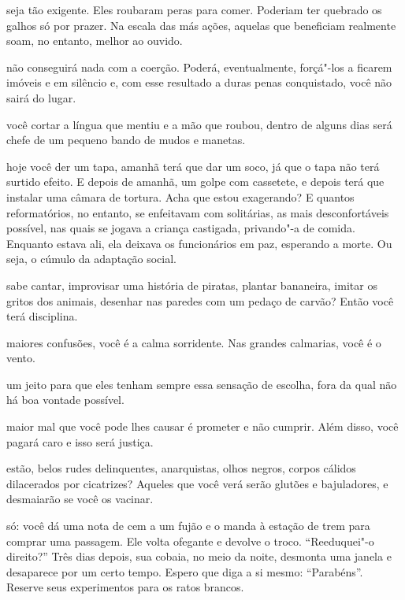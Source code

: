 \bigskip
\bigskip

 seja tão exigente. Eles roubaram peras para comer. Poderiam ter
quebrado os galhos só por prazer. Na escala das más ações, aquelas que
beneficiam realmente soam, no entanto, melhor ao ouvido.

\bigskip
\bigskip

 não conseguirá nada com a coerção. Poderá, eventualmente, forçá"-los
a ficarem imóveis e em silêncio e, com esse resultado a duras penas
conquistado, você não sairá do lugar.



 você cortar a língua que mentiu e a mão que roubou, dentro de alguns
dias será chefe de um pequeno bando de mudos e manetas.



 hoje você der um tapa, amanhã terá que dar um soco, já que o tapa não
terá surtido efeito. E depois de amanhã, um golpe com cassetete, e
depois terá que instalar uma câmara de tortura. Acha que estou
exagerando? E quantos reformatórios, no entanto, se enfeitavam com
solitárias, as mais desconfortáveis possível, nas quais se jogava a
criança castigada, privando"-a de comida. Enquanto estava ali, ela
deixava os funcionários em paz, esperando a morte. Ou seja, o cúmulo da
adaptação social.



 sabe cantar, improvisar uma história de piratas, plantar bananeira,
imitar os gritos dos animais, desenhar nas paredes com um pedaço de
carvão? Então você terá disciplina.

\pagebreak

 maiores confusões, você é a calma sorridente. Nas grandes calmarias,
você é o vento.



 um jeito para que eles tenham sempre essa sensação de escolha, fora
da qual não há boa vontade possível.



 maior mal que você pode lhes causar é prometer e não cumprir. Além
disso, você pagará caro e isso será justiça.



 estão, belos rudes delinquentes, anarquistas, olhos negros, corpos
cálidos dilacerados por cicatrizes? Aqueles que você verá serão glutões
e bajuladores, e desmaiarão se você os vacinar.


 só: você dá uma nota de cem a um fujão e o manda à estação de trem
para comprar uma passagem. Ele volta ofegante e devolve o troco.
``Reeduquei"-o direito?'' Três dias depois, sua cobaia, no meio da noite,
desmonta uma janela e desaparece por um certo tempo. Espero que diga a
si mesmo: ``Parabéns''. Reserve seus experimentos para os ratos brancos.

